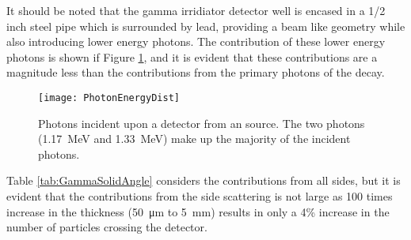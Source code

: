 \documentclass[draftcls,onecolumn]{IEEEtran}
\begin{document}
It should be noted that the gamma irridiator detector well is encased in a 1/2 inch steel pipe which is surrounded by lead, providing a beam like geometry while also introducing lower energy photons. 
The contribution of these lower energy photons is shown if Figure \ref{fig:PhotonFluxAllEnergies}, and it is evident that these contributions are a magnitude less than the contributions from the primary photons of the  decay.
\begin{figure}
  \texttt{[image: PhotonEnergyDist]}
	\caption[Photons Incident upon Detector]{Photons incident upon a detector from an  source.  The two  photons (\SI{1.17}{\MeV} and \SI{1.33}{\MeV}) make up the majority of the incident photons.}
  \label{fig:PhotonFluxAllEnergies}
\end{figure}
Table \ref{tab:GammaSolidAngle} considers the contributions from all sides, but it is evident that the contributions from the side scattering is not large as 100 times increase in the thickness (\SI{50}{\um} to \SI{5}{\mm}) results in only a 4\% increase in the number of particles crossing the detector.

\pagebreak
\end{document}
